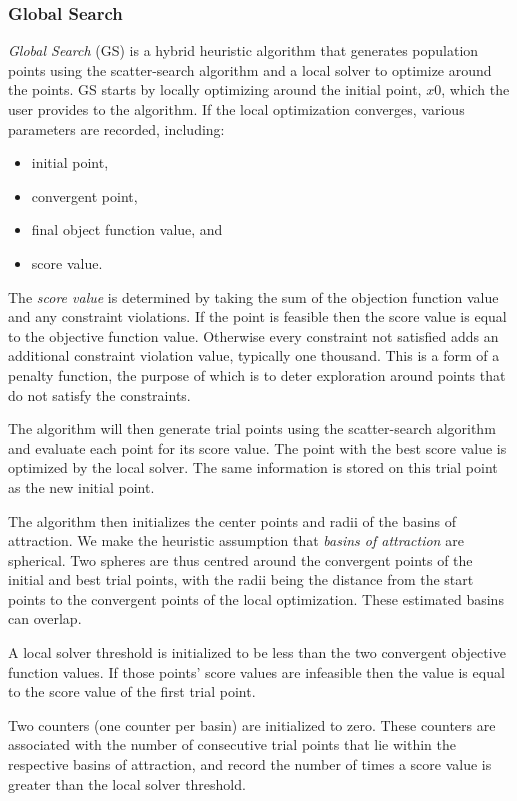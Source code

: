 \subsubsection{Global Search}
\textit{Global Search} (GS) is a hybrid heuristic algorithm that generates population points using the scatter-search algorithm \cite{Glover1998a} and a local solver to optimize around the points. GS starts by locally optimizing around the initial point, $x0$, which the user provides to the algorithm. If the local optimization converges, various parameters are recorded, including:
\begin{itemize}
    \item initial point,
    \item convergent point,
    \item final object function value, and
    \item score value. 
\end{itemize}

The \textit{score value} is determined by taking the sum of the objection function value and any constraint violations. If the point is feasible then the score value is equal to the objective function value. Otherwise every constraint not satisfied adds an additional constraint violation value, typically one thousand. This is a form of a penalty function, the purpose of which is to deter exploration around points that do not satisfy the constraints. 

The algorithm will then generate trial points using the scatter-search algorithm and evaluate each point for its score value. The point with the best score value is optimized by the local solver. The same information is stored on this trial point as the new initial point. 

The algorithm then initializes the center points and radii of the basins of attraction. We make the heuristic assumption that \textit{basins of attraction} are spherical. Two spheres are thus centred around the convergent points of the initial and best trial points, with the radii being the distance from the start points to the convergent points of the local optimization. These estimated basins can overlap. 

A local solver threshold is initialized to be less than the two convergent objective function values. If those points' score values are infeasible then the value is equal to the score value of the first trial point. 

Two counters (one counter per basin) are initialized to zero. These counters are associated with the number of consecutive trial points that lie within the respective basins of attraction, and record the number of times a score value is greater than the local solver threshold. 

